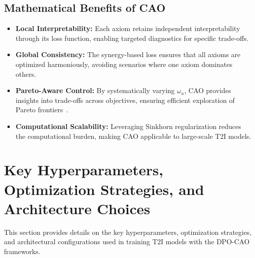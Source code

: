 \subsection{Mathematical Benefits of CAO}
\begin{itemize}
    \item \textbf{Local Interpretability:}  
    Each axiom retains independent interpretability through its loss function, enabling targeted diagnostics for specific trade-offs.
    \item \textbf{Global Consistency:}  
    The synergy-based loss ensures that all axioms are optimized harmoniously, avoiding scenarios where one axiom dominates others.
    \item \textbf{Pareto-Aware Control:}  
    By systematically varying $\omega_a$, CAO provides insights into trade-offs across objectives, ensuring efficient exploration of Pareto frontiers~\cite{deb2001multi}.
    \item \textbf{Computational Scalability:}  
    Leveraging Sinkhorn regularization reduces the computational burden, making CAO applicable to large-scale T2I models.
\end{itemize}




\section{Key Hyperparameters, Optimization Strategies, and Architecture Choices}
\label{sec:appendix:hyperparams}

This section provides details on the key hyperparameters, optimization strategies, and architectural configurations used in training T2I models with the DPO-CAO frameworks.

